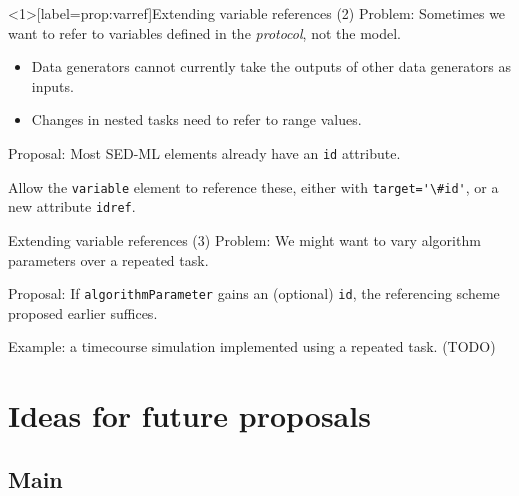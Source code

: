\documentclass[t,xcolor={usenames,dvipsnames}]{beamer}
\newcommand{\sedml}[1]{\lstinline[basicstyle=\color{blue}]!#1!}
\begin{document}

\begin{frame}<1>[label=prop:varref]{Extending variable references (2)}
\alert{Problem}:
 Sometimes we want to refer to variables defined in the
 \emph{protocol}, not the model.

\begin{itemize}
\item
 Data generators cannot currently take the outputs of other data
 generators as inputs.
\item
 Changes in nested tasks need to refer to range values.
\end{itemize}

\alert{Proposal}:
 Most SED-ML elements already have an \sedml{id} attribute.

 Allow the \sedml{variable} element to reference these, either with
 \sedml{target='\#id'}, or a new attribute \sedml{idref}.
\end{frame}


\begin{frame}{Extending variable references (3)}
\alert{Problem}:
 We might want to vary algorithm parameters over a repeated task.

\alert{Proposal}:
 If \sedml{algorithmParameter} gains an (optional) \sedml{id}, the
 referencing scheme proposed earlier suffices.

Example: a timecourse simulation implemented using a repeated task.
(TODO)
\end{frame}


\section{Ideas for future proposals}
\subsection*{Main}
\end{document}
